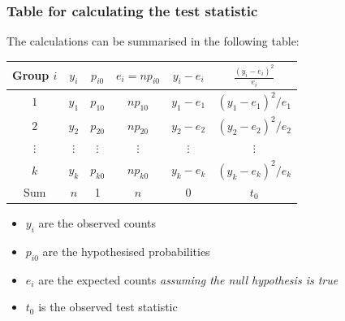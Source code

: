 \documentclass[a4paper]{article}\usepackage[]{graphicx}\usepackage[]{xcolor}
\begin{document}
\subsubsection{Table for calculating the test statistic}
The calculations can be summarised in the following table:
\begin{table}[H]
	\centering
	\begin{tabular}{@{}c|ccccc@{}}
	Group \( i \) & \( y_i \)  	 & \( p_{i0} \) & \( e_i = np_{i0} \) & \( y_i - e_i \) & \( \frac{(y_i - e_i)^2}{e_i} \) \\ \midrule
	\( 1 \) 	  & \( y_1 \)  	 & \( p_{10} \) & \( np_{10} \)       & \( y_1 - e_1 \) & \( (y_1 - e_1)^2/e_1 \) \\
	\( 2 \)   	  & \( y_2 \)  	 & \( p_{20} \) & \( np_{20} \)	  	  & \( y_2 - e_2 \) & \( (y_2 - e_2)^2/e_2 \) \\
	\( \vdots \)  & \( \vdots \) & \( \vdots \) & \( \vdots \) 	  	  & \( \vdots \) 	& \( \vdots \) 					  \\
	\( k \)   	  & \( y_k \) 	 & \( p_{k0} \)	& \( np_{k0} \) 	  & \( y_k - e_k \) & \( (y_k - e_k)^2/e_k \) \\ \midrule
	Sum 		  & \( n \) 	 & 1 			& \( n \) 			  & 0 				& \( t_0 \) 
	\end{tabular}
\end{table}
\begin{itemize}
	\item \( y_i \) are the observed counts
	\item \( p_{i0} \) are the hypothesised probabilities
	\item \( e_i \) are the expected counts \textit{assuming the null hypothesis is true}
	\item \( t_0 \) is the observed test statistic
\end{itemize}
\end{document}
